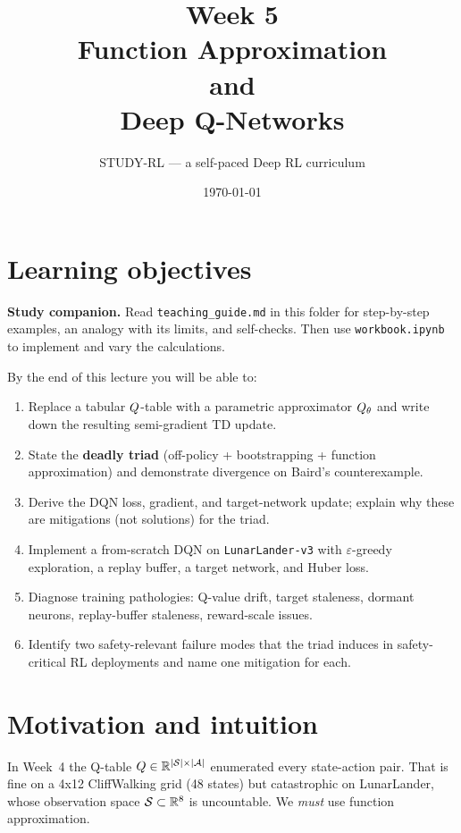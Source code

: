 \documentclass[11pt,oneside]{scrbook}
\title{{\color{rlblue}\textbf{Week 5}} \\[0.4em] \Huge Function Approximation \\[0.1em] and \\[0.1em] Deep Q-Networks}
\author{STUDY-RL --- a self-paced Deep RL curriculum}
\date{\today}
\begin{document}
\maketitle
\tableofcontents
\newpage

\chapter*{Learning objectives}


\noindent\textbf{Study companion.} Read \texttt{teaching\_guide.md} in this
folder for step-by-step examples, an analogy with its limits, and self-checks.
Then use \texttt{workbook.ipynb} to implement and vary the calculations.
\par\medskip

\begin{keyidea}
By the end of this lecture you will be able to:
\begin{enumerate}
  \item Replace a tabular $Q$-table with a parametric approximator $Q_\theta$ and write down the resulting semi-gradient TD update.
  \item State the \textbf{deadly triad} (off-policy + bootstrapping + function approximation) and demonstrate divergence on Baird's counterexample.
  \item Derive the DQN loss, gradient, and target-network update; explain why these are mitigations (not solutions) for the triad.
  \item Implement a from-scratch DQN on \texttt{LunarLander-v3} with $\varepsilon$-greedy exploration, a replay buffer, a target network, and Huber loss.
  \item Diagnose training pathologies: Q-value drift, target staleness, dormant neurons, replay-buffer staleness, reward-scale issues.
  \item Identify two safety-relevant failure modes that the triad induces in safety-critical RL deployments and name one mitigation for each.
\end{enumerate}
\end{keyidea}

\chapter{Motivation and intuition}

In Week~4 the Q-table $Q \in \mathbb{R}^{|\mathcal{S}|\times|\mathcal{A}|}$ enumerated every
state-action pair. That is fine on a 4x12 CliffWalking grid (48 states) but catastrophic on
LunarLander, whose observation space $\mathcal{S} \subset \mathbb{R}^8$ is uncountable. We
\emph{must} use function approximation.
\end{document}
